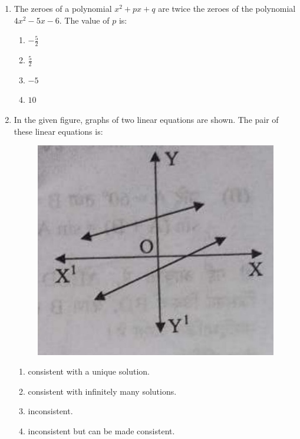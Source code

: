 \begin{enumerate}
\item The zeroes of a polynomial $x^2 + px + q$ are twice the zeroes of the polynomial $4x^2 - 5x - 6$. The value of $p$ is:
	\begin{enumerate}   
\item $-\frac{5}{2}$
    \item $\frac{5}{2}$
    \item $-5$
    \item $10$
	\end{enumerate}
\newpage
 \item In the given figure, graphs of two linear equations are shown. The pair of these linear equations is:
\begin{figure}[!ht]
\centering
\includegraphics[width=\columnwidth]{figs/Image1.jpg}
\caption{}
\label{fig:enter-label}
\end{figure}
\begin{enumerate}
    \item consistent with a unique solution.
    \item consistent with infinitely many solutions.
    \item inconsistent.
    \item inconsistent but can be made consistent.
\end{enumerate}
\end{enumerate}
